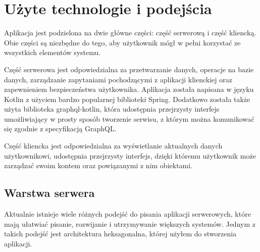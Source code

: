 \newpage
\section{Użyte technologie i podejścia}
Aplikacja jest podzielona na dwie główne części: część serwerową i część kliencką. Obie części są niezbędne do tego, aby użytkownik mógł w pełni korzystać ze wszystkich elementów systemu.

Część serwerowa jest odpowiedzialna za przetwarzanie danych, operacje na bazie danych, zarządzanie zapytaniami pochodzącymi z aplikacji klienckiej oraz zapewnieniem bezpieczeństwa użytkownika. Aplikacja została napisana w języku Kotlin z użyciem bardzo popularnej biblioteki Spring. Dodatkowo została także użyta biblioteka graphql-kotlin, która udostępnia przejrzysty interfejs umożliwiający w prosty sposób tworzenie serwisu, z którym można komunikować się zgodnie z specyfikacją GraphQL.


Część kliencka jest odpowiedzialna za wyświetlanie aktualnych danych użytkownikowi, udostępnia przejrzysty interfejs, dzięki któremu użytkownik może zarządzać swoim kontem oraz powiązanymi z nim obiektami.


\subsection{Warstwa serwera}
Aktualnie istnieje wiele różnych podejść do pisania aplikacji serwerowych, które mają ułatwiać pisanie, rozwijanie i utrzymywanie większych systemów. Jednym z takich podejść jest architektura heksagonalna, której użyłem do stworzenia aplikacji.
